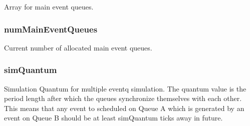 Array for main event queues. \hypertarget{eventq_8hh_a0cb37c490e14c37cdcc040c2392feda1}{
\subsubsection[{numMainEventQueues}]{ {\bf numMainEventQueues}}}
\label{eventq_8hh_a0cb37c490e14c37cdcc040c2392feda1}


Current number of allocated main event queues. \hypertarget{eventq_8hh_a1184f025d31220089a3af9dfc6eeb4d4}{
\subsubsection[{simQuantum}]{ {\bf simQuantum}}}
\label{eventq_8hh_a1184f025d31220089a3af9dfc6eeb4d4}
Simulation Quantum for multiple eventq simulation. The quantum value is the period length after which the queues synchronize themselves with each other. This means that any event to scheduled on Queue A which is generated by an event on Queue B should be at least simQuantum ticks away in future. 